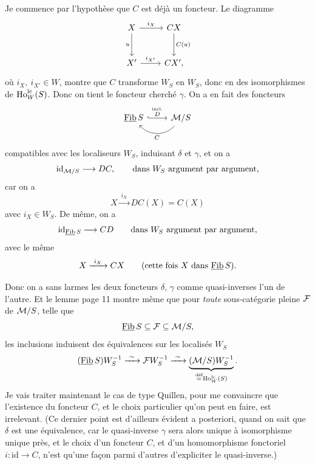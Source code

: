 Je commence par l'hypothèse que $C$ est déjà un foncteur. Le diagramme
\[
\begin{tikzcd}[row sep=large]
X \arrow[r, "i_X"] \arrow[d, "u"'] & CX \arrow[d, "C(u)"] \\
X' \arrow[r, "i_{X'}"] & CX',
\end{tikzcd}
\]
où $i_X,\ i_{X'}\in W$, montre que $C$ transforme $W_S$ en $W_S$, donc en des isomorphismes de
$\mathrm{Ho}^{\mathrm{lc}}_W(S)$. Donc on tient le foncteur cherché $\gamma$. On a en fait des foncteurs
\[
\begin{tikzcd}
\Fib S \arrow[r, hook, "\overset{\text{incl.}}{D}"] & \cM/S \arrow[l, bend left=50, "C"]
\end{tikzcd}
\]
compatibles avec les localiseurs $W_S$, induisant $\delta$ et $\gamma$, et on a
\[
\mathrm{id}_{\mathcal{M}/S}\longrightarrow DC, \qquad \text{dans $W_S$ argument par argument,}
\]
car on a
\[
X\xrightarrow{\ i_X\ }DC(X)=C(X)
\]
avec $i_X\in W_S$. De même, on a
\[
\mathrm{id}_{\underline{\mathrm{Fib}}\, S}\longrightarrow CD \qquad \text{dans $W_S$ argument par argument,}
\]
avec le même
\[
X\xrightarrow{\ i_X\ }CX \qquad \text{(cette fois $X$ dans $\underline{\mathrm{Fib}}\, S$).}
\]

Donc on a sans larmes les deux foncteurs $\delta$, $\gamma$ comme quasi-inverses l'un de l'autre. Et le
lemme page 11 montre même que pour \textit{toute} sous-catégorie pleine $\mathcal{F}$ de $\mathcal{M}/S$, telle que
\[
\underline{\mathrm{Fib}}\, S\subseteq\mathcal{F}\subseteq\mathcal{M}/S,
\]
les inclusions induisent des équivalences sur les localisés $W_S$
\[
(\Fib S)W_S^{-1}\xrightarrow{\ \sim\ }\cF W_S^{-1}\xrightarrow{\ \sim\ }\underbrace{(\cM/S)W_S^{-1}}_{\overset{\text{déf}}{=}\Ho^{\mathrm{lc}}_W(S)}.
\]
Je vais traiter maintenant le cas de type Quillen, pour me convaincre que l'existence du
foncteur $C$, et le choix particulier qu'on peut en faire, est irrelevant. (Ce dernier point
est d'ailleurs évident a posteriori, quand on sait que $\delta$ est une équivalence, car le quasi-inverse
$\gamma$ sera alors unique à isomorphisme unique près, et le choix d'un foncteur $C$, et
d'un homomorphisme fonctoriel $i:\mathrm{id}\longrightarrow C$, n'est qu'une façon parmi d'autres d'expliciter
le quasi-inverse.)

